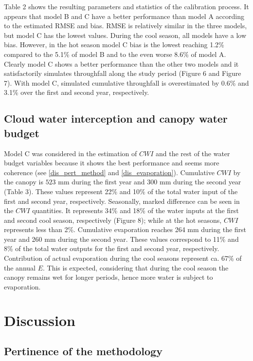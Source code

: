 \documentclass[a4paper,12pt]{article}
\begin{document}
Table 2 shows the resulting parameters and statistics of the calibration process. It appears that model B and C have a better performance than model A according to the estimated RMSE and bias. RMSE is relatively similar in the three models, but model C has the lowest values. During the cool season, all models have a low bias. However, in the hot season model C bias is the lowest reaching 1.2\% compared to the 5.1\% of model B and to the even worse 8.6\% of model A. Clearly model C shows a better performance than the other two models and it satisfactorily simulates throughfall along the study period (Figure 6 and Figure 7). With model C, simulated cumulative throughfall is overestimated by 0.6\% and 3.1\% over the first and second year, respectively.



\subsection{Cloud water interception and canopy water budget}
Model C was considered in the estimation of $CWI$ and the rest of the water budget variables because it shows the best performance and seems more coherence (see \autoref{dis_pert_method} and \autoref{dis_evaporation}). Cumulative $CWI$ by the canopy is $523$ $\mathrm{{mm}}$ during the first year and $300$ $\mathrm{{mm}}$ during the second year (Table 3). These values represent 22\% and 10\% of the total water input of the first and second year, respectively. Seasonally, marked difference can be seen in the $CWI$ quantities. It represents 34\% and 18\% of the water inputs at the first and second cool season, respectively (Figure 8); while at the hot seasons, $CWI$ represents less than 2\%. Cumulative evaporation reaches 264 mm during the first year and 260 mm during the second year. These values correspond to 11\% and 8\% of the total water outputs for the first and second year, respectively. Contribution of actual evaporation during the cool seasons represent ca. 67\% of the annual $E$. This is expected, considering that during the cool season the canopy remains wet for longer periods, hence more water is subject to evaporation.

\section{Discussion}

\subsection{Pertinence of the methodology} \label{dis_pert_method}
\end{document}

